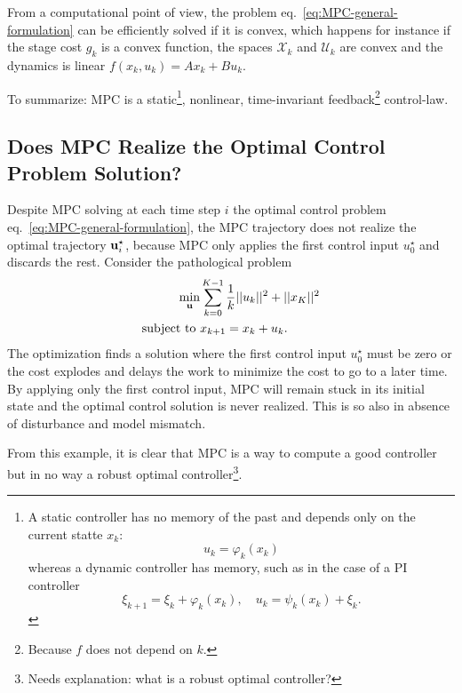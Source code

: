 From a computational point of view, the problem eq.~\eqref{eq:MPC-general-formulation} can be efficiently solved if it is convex, which happens for instance if the stage cost $g_k$ is a convex function, the spaces $\mathcal{X}_k$ and $\mathcal{U}_k$ are convex and the dynamics is linear $f(x_k,u_k)=Ax_k+Bu_k$.


To summarize: MPC is a static\footnote{A static controller has no memory of the past and depends only on the current statte $x_k$:
  \begin{equation*}
    u_k = \varphi_k(x_k)
  \end{equation*}
  whereas a dynamic controller has memory, such as in the case of a
  PI controller
  \begin{equation*}
    \xi_{k+1} = \xi_k + \varphi_k(x_k),\quad u_k = \psi_k(x_k) + \xi_k.
  \end{equation*}}, nonlinear, time-invariant feedback\footnote{Because $f$ does not depend on $k$.} control-law.


\subsection{Does MPC Realize the Optimal Control Problem Solution?}
\label{sec:MPC-not-an-optimal-control-solver}

Despite MPC solving at each time step $i$ the optimal control problem eq.~\eqref{eq:MPC-general-formulation}, the MPC trajectory does not realize the optimal trajectory $\boldsymbol{\mathrm{u}}_i^\star$, because MPC only applies the first control input $u_0^\star$ and discards the rest. Consider the pathological problem
\begin{align*}
  \min_{\boldsymbol{\mathrm{u}}} & \sum_{k=0}^{K-1}\frac {1}{k}||u_k||^2 + ||x_K||^2\\
  \text{subject to } &x_{k+1} = x_k+u_k.
\end{align*}
The optimization finds a solution where the first control input $u_0^\star$ must be zero or the cost explodes and delays the work to minimize the cost to go to a later time. By applying only the first control input, MPC will remain stuck in its initial state and the optimal control solution is never realized. This is so also in absence of disturbance and model mismatch.

From this example, it is clear that MPC is a way to compute a good controller but in no way a robust optimal controller\footnote{Needs explanation: what is a robust optimal controller?}.

